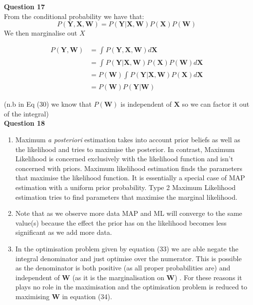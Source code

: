 \documentclass[10pt, a4paper, twocolumn]{article} %
\begin{document}
\begin{enumerate}
  \textbf{Question 17}\\
  From the conditional probability we have that:
  \begin{equation}
     P(\mathbf{Y}, \mathbf{X}, \mathbf{W}) = P(\mathbf{Y}|\mathbf{X}, \mathbf{W})P(\mathbf{X})P(\mathbf{W})
  \end{equation}
  We then marginalise out $X$
  
  \begin{align}
    P(\mathbf{Y},\mathbf{W}) &= \int_{}^{} P(\mathbf{Y}, \mathbf{X}, \mathbf{W})  d\mathbf{X}\\
    &=  \int_{}^{} P(\mathbf{Y}|\mathbf{X}, \mathbf{W})P(\mathbf{X})P(\mathbf{W}) d\mathbf{X}\\
    &= P(\mathbf{W}) \int_{}^{} P(\mathbf{Y}|\mathbf{X}, \mathbf{W})P(\mathbf{X}) d\mathbf{X}\\
    &= P(\mathbf{W}) P(\mathbf{Y}|\mathbf{W})
  \end{align}
 
    (n.b in Eq (30) we know that $P(\mathbf{W})$ is independent of $\mathbf{X}$ so we can factor it out of the integral)\\

\textbf{Question 18}
 \begin{enumerate}
 
\item 
Maximum \textit{a posteriori} estimation takes into account prior beliefs as well as the likelihood and tries to maximise the posterior. In contrast, Maximum Likelihood is concerned exclusively with the likelihood function and isn't concerned with priors.
Maximum likelihood estimation finds the parameters that maximise the likelihood function. It is essentially a special case of MAP estimation with a uniform prior probability.
Type 2 Maximum Likelihood estimation tries to find parameters that maximise the marginal likelihood.\\

\item      
Note that as we observe more data MAP and ML will converge to the same value(s) because the effect the prior has on the likelihood becomes less significant as we add more data. \\
      
\item
In the optimisation problem given by equation (33) we are able negate the integral denominator and just optimise over the numerator. This is possible as the denominator is both positive (as all proper probabilities are) and independent of $\mathbf{W}$ (as it is the marginalisation on $\mathbf{W}$) . For these reasons it plays no role in the maximisation and the optimisation problem is reduced to maximising $\mathbf{W}$ in equation (34).     


\end{enumerate}
\end{enumerate}
\end{document}
